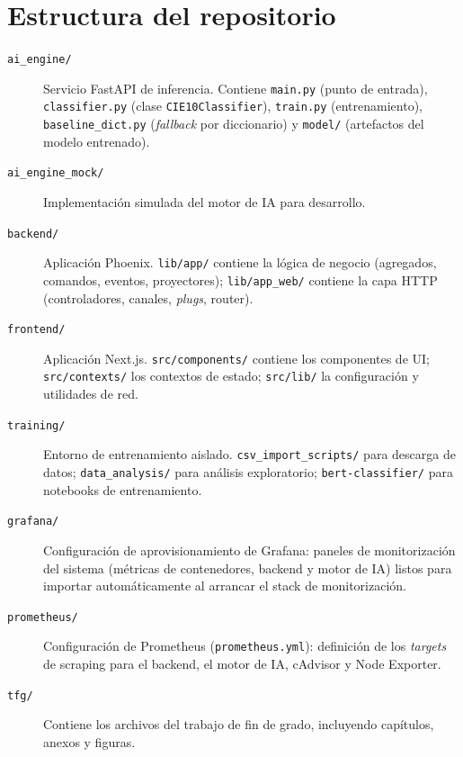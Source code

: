 \section{Estructura del repositorio}

\begin{description}
    \item[\texttt{ai\_engine/}] Servicio FastAPI de inferencia. Contiene \texttt{main.py} (punto de entrada), \texttt{classifier.py} (clase \texttt{CIE10Classifier}), \texttt{train.py} (entrenamiento), \texttt{baseline\_dict.py} (\emph{fallback} por diccionario) y \texttt{model/} (artefactos del modelo entrenado).
    \item[\texttt{ai\_engine\_mock/}] Implementación simulada del motor de IA para desarrollo.
    \item[\texttt{backend/}] Aplicación Phoenix. \texttt{lib/app/} contiene la lógica de negocio (agregados, comandos, eventos, proyectores); \texttt{lib/app\_web/} contiene la capa HTTP (controladores, canales, \emph{plugs}, router).
    \item[\texttt{frontend/}] Aplicación Next.js. \texttt{src/components/} contiene los componentes de UI; \texttt{src/contexts/} los contextos de estado; \texttt{src/lib/} la configuración y utilidades de red.
    \item[\texttt{training/}] Entorno de entrenamiento aislado. \texttt{csv\_import\_scripts/} para descarga de datos; \texttt{data\_analysis/} para análisis exploratorio; \texttt{bert-classifier/} para notebooks de entrenamiento.
    \item[\texttt{grafana/}] Configuración de aprovisionamiento de Grafana: paneles de monitorización del sistema (métricas de contenedores, backend y motor de IA) listos para importar automáticamente al arrancar el stack de monitorización.
    \item[\texttt{prometheus/}] Configuración de Prometheus (\texttt{prometheus.yml}): definición de los \emph{targets} de scraping para el backend, el motor de IA, cAdvisor y Node Exporter.
    \item[\texttt{tfg/}] Contiene los archivos del trabajo de fin de grado, incluyendo capítulos, anexos y figuras.
\end{description}
